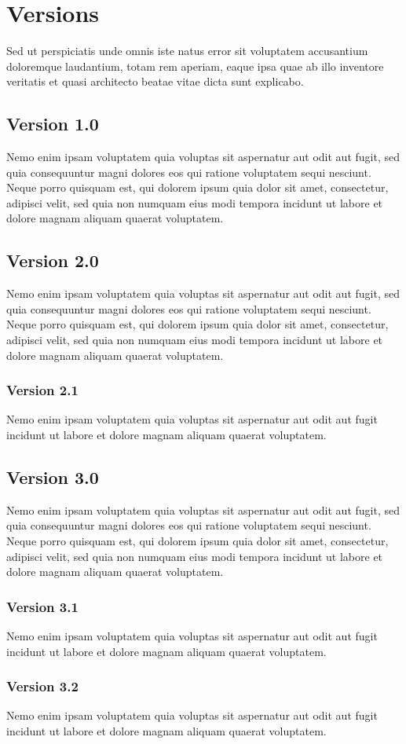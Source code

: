 \section{\huge{Versions}}
Sed ut perspiciatis unde omnis iste natus error sit voluptatem accusantium doloremque laudantium, totam rem aperiam, eaque ipsa quae ab illo inventore veritatis et quasi architecto beatae vitae dicta sunt explicabo.

\subsection{Version 1.0}
Nemo enim ipsam voluptatem quia voluptas sit aspernatur aut odit aut fugit, sed quia consequuntur magni dolores eos qui ratione voluptatem sequi nesciunt. Neque porro quisquam est, qui dolorem ipsum quia dolor sit amet, consectetur, adipisci velit, sed quia non numquam eius modi tempora incidunt ut labore et dolore magnam aliquam quaerat voluptatem.

\subsection{Version 2.0}
Nemo enim ipsam voluptatem quia voluptas sit aspernatur aut odit aut fugit, sed quia consequuntur magni dolores eos qui ratione voluptatem sequi nesciunt. Neque porro quisquam est, qui dolorem ipsum quia dolor sit amet, consectetur, adipisci velit, sed quia non numquam eius modi tempora incidunt ut labore et dolore magnam aliquam quaerat voluptatem.

\subsubsection{Version 2.1}
Nemo enim ipsam voluptatem quia voluptas sit aspernatur aut odit aut fugit incidunt ut labore et dolore magnam aliquam quaerat voluptatem.

\subsection{Version 3.0}
Nemo enim ipsam voluptatem quia voluptas sit aspernatur aut odit aut fugit, sed quia consequuntur magni dolores eos qui ratione voluptatem sequi nesciunt. Neque porro quisquam est, qui dolorem ipsum quia dolor sit amet, consectetur, adipisci velit, sed quia non numquam eius modi tempora incidunt ut labore et dolore magnam aliquam quaerat voluptatem.

\subsubsection{Version 3.1}
Nemo enim ipsam voluptatem quia voluptas sit aspernatur aut odit aut fugit incidunt ut labore et dolore magnam aliquam quaerat voluptatem.

\subsubsection{Version 3.2}
Nemo enim ipsam voluptatem quia voluptas sit aspernatur aut odit aut fugit incidunt ut labore et dolore magnam aliquam quaerat voluptatem.
